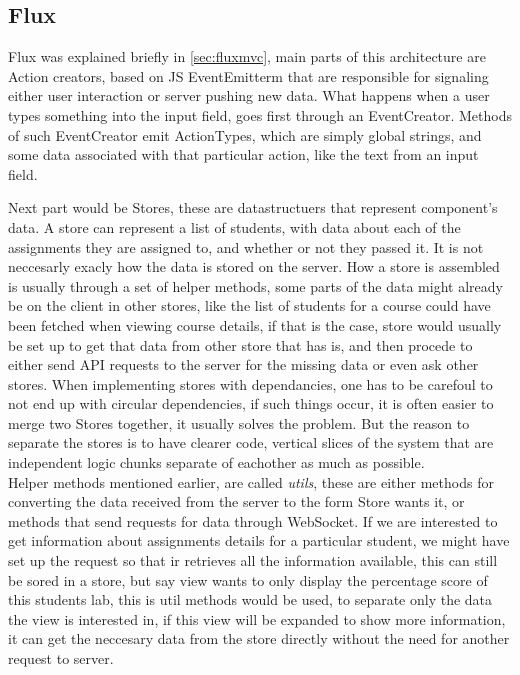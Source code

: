 \subsection{Flux}
Flux was explained briefly in \ref{sec:fluxmvc}, main parts of this architecture are Action creators, based on JS EventEmitterm that are responsible for signaling either user interaction or server pushing new data. What happens when a user types something into the input field, goes first through an EventCreator. Methods of such EventCreator emit ActionTypes, which are simply global strings, and some data associated with that particular action, like the text from an input field.

Next part would be Stores, these are datastructuers that represent component's data. A store can represent a list of students, with data about each of the assignments they are assigned to, and whether or not they passed it. It is not neccesarly exacly how the data is stored on the server. How a store is assembled is usually through a set of helper methods, some parts of the data might already be on the client in other stores, like the list of students for a course could have been fetched when viewing course details, if that is the case, store would usually be set up to get that data from other store that has is, and then procede to either send API requests to the server for the missing data or even ask other stores. When implementing stores with dependancies, one has to be carefoul to not end up with circular dependencies, if such things occur, it is often easier to merge two Stores together, it usually solves the problem. But the reason to separate the stores is to have clearer code, vertical slices of the system that are independent logic chunks separate of eachother as much as possible.
\\Helper methods mentioned earlier, are called \emph{utils}, these are either methods for converting the data received from the server to the form Store wants it, or methods that send requests for data through WebSocket. If we are interested to get information about assignments details for a particular student, we might have set up the request so that ir retrieves all the information available, this can still be sored in a store, but say view wants to only display the percentage score of this students lab, this is util methods would be used, to separate only the data the view is interested in, if this view will be expanded to show more information, it can get the neccesary data from the store directly without the need for another request to server.
